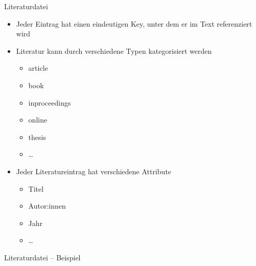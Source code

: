 \documentclass[presentation,aspectratio=169]{beamer}
\begin{document}
\begin{frame}[fragile]{Literaturdatei}
  \begin{itemize}
    \item Jeder Eintrag hat einen eindeutigen Key, unter dem er im Text referenziert wird
    \item Literatur kann durch verschiedene Typen kategorisiert werden
      \begin{itemize}
        \item article
        \item book
        \item inproceedings
        \item online
        \item thesis
        \item \dots
      \end{itemize}
    \item Jeder Literatureintrag hat verschiedene Attribute
      \begin{itemize}
        \item Titel
        \item Autor:innen
        \item Jahr
        \item \dots
      \end{itemize}
  \end{itemize}
\end{frame}

\begin{frame}[fragile]{Literaturdatei -- Beispiel}
  \inputminted{bibtex}{codebeispiele/bib-file.bib}
\end{frame}
\end{document}
